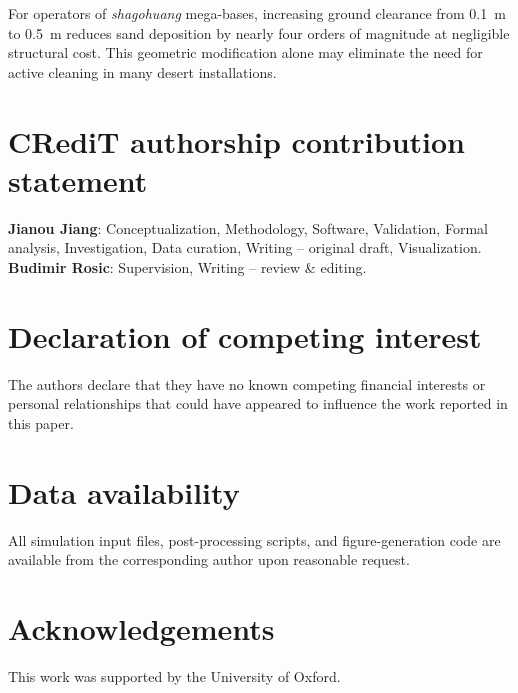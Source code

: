 \documentclass[preprint,12pt,review]{elsarticle}
\begin{document}
For operators of \emph{shagohuang} mega-bases, increasing ground clearance from 0.1~m to 0.5~m reduces sand deposition by nearly four orders of magnitude at negligible structural cost. This geometric modification alone may eliminate the need for active cleaning in many desert installations.

\section*{CRediT authorship contribution statement}
\textbf{Jianou Jiang}: Conceptualization, Methodology, Software, Validation, Formal analysis, Investigation, Data curation, Writing -- original draft, Visualization.
\textbf{Budimir Rosic}: Supervision, Writing -- review \& editing.

\section*{Declaration of competing interest}
The authors declare that they have no known competing financial interests or personal relationships that could have appeared to influence the work reported in this paper.

\section*{Data availability}
All simulation input files, post-processing scripts, and figure-generation code are available from the corresponding author upon reasonable request.

\section*{Acknowledgements}
This work was supported by the University of Oxford.



\end{document}
